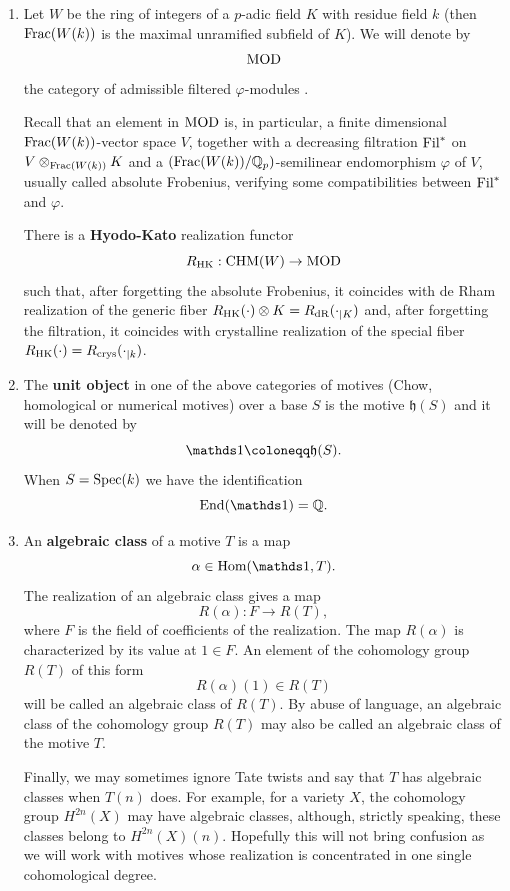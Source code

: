 \begin{enumerate}
The realization functor are sometimes used in their enriched form, i.e. $R_B$ provides Hodge structures, $R_\ell$ provides Galois representations, $R_\dR$ provides filtered vector spaces and $R_\crys$ provides absolute Frobenius actions, see \cite[\S 7.1]{Andmot}.

\item\label{Hyodo-Kato} Let $W$ be the ring of integers  of a $p$-adic field $K$ with residue field $k$ (then $\mathrm{Frac} (W(k))$ is the maximal unramified subfield of $K$). We will denote by  \[\textnormal{MOD}\] the category  of admissible filtered $\varphi$-modules \cite{BertOgus,HyodoKato,NiziFred}.

Recall that an element in $\textnormal{MOD}$ is, in particular, a finite dimensional  $\mathrm{Frac} (W(k))$-vector space $V$, together with a decreasing filtration $\textnormal{Fil}^*$ on $V\otimes_{\mathrm{Frac} (W(k))} K$ and a $(\mathrm{Frac} (W(k))/\mathbb{Q}_p)$-semilinear endomorphism $\varphi$ of $V$, usually called absolute Frobenius, verifying some compatibilities between $\textnormal{Fil}^*$ and $\varphi$.

There is a \textbf{Hyodo-Kato} realization functor \[R_{\mathrm{HK}}: \mathrm{CHM}(W)\rightarrow \textnormal{MOD}\]
such that, after forgetting the absolute Frobenius, it coincides with de Rham realization of the generic fiber $R_{\mathrm{HK}}(\cdot)\otimes K=R_{\mathrm{dR}}(\cdot_{\vert K})$  and, after forgetting the filtration, it coincides with  crystalline realization of the special fiber $R_{\mathrm{HK}}(\cdot) = R_{\textnormal{crys}}(\cdot_{\vert k})$.
\item The \textbf{unit object} in one of the above categories of motives (Chow, homological or numerical motives) over a base $S$ is the motive $\mathfrak{h}(S)$ and it will be denoted by
\[\one \coloneqq \mathfrak{h}(S).\]
When $S=\textnormal{Spec}(k)$ we have the identification
\[\End(\one)=\Q.\]
\item An \textbf{algebraic class} of a motive $T$ is a map \[\alpha\in\Hom(\one, T).\]
The realization of an algebraic class gives a map
\[R(\alpha) : F \longrightarrow R(T),\]
where $F$ is the field of coefficients of the realization.
The map $R(\alpha)$ is characterized by its value at $1\in F$. An element of the cohomology group $R(T)$ of this form
\[R(\alpha)(1) \in R(T)\]
will be called an algebraic class of  $R(T)$. By abuse of language, an algebraic class of the cohomology group $R(T)$ may also be called an algebraic class of the motive $T$.


Finally, we  may sometimes ignore Tate twists and say that $T$ has algebraic classes when $T(n)$ does. For example, for a variety $X$, the cohomology group $H^{2n}(X)$ may have algebraic classes, although, strictly speaking, these classes belong to $H^{2n}(X)(n).$ Hopefully this will not bring confusion as we will work with motives whose realization is concentrated in one single cohomological degree.



\end{enumerate}
